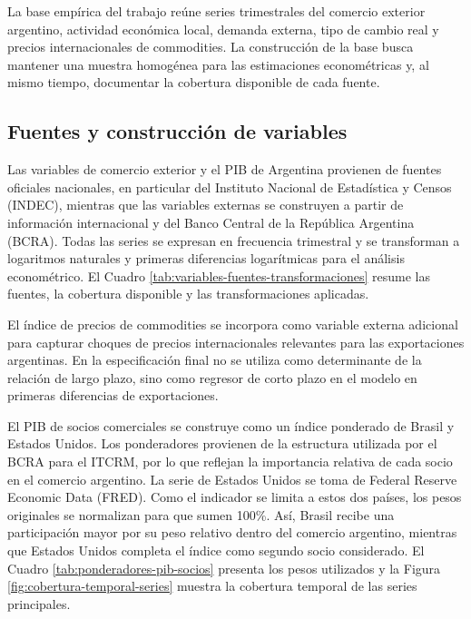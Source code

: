 \documentclass[11pt]{article}
\begin{document}
La base empírica del trabajo reúne series trimestrales del comercio exterior
argentino, actividad económica local, demanda externa, tipo de cambio real y
precios internacionales de commodities. La construcción de la base busca
mantener una muestra homogénea para las estimaciones econométricas y, al mismo
tiempo, documentar la cobertura disponible de cada fuente.

\subsection{Fuentes y construcción de variables}
\label{subsec:fuentes-construccion-variables}

Las variables de comercio exterior y el PIB de Argentina provienen de fuentes
oficiales nacionales, en particular del Instituto Nacional de Estadística y
Censos (INDEC), mientras que las variables externas se construyen a partir de
información internacional y del Banco Central de la República Argentina (BCRA).
Todas las series se expresan en frecuencia trimestral y se transforman a
logaritmos naturales y primeras diferencias logarítmicas para el análisis
econométrico. El Cuadro \ref{tab:variables-fuentes-transformaciones} resume las
fuentes, la cobertura disponible y las transformaciones aplicadas.

El índice de precios de commodities se incorpora como variable externa adicional
para capturar choques de precios internacionales relevantes para las exportaciones
argentinas. En la especificación final no se utiliza como determinante de la
relación de largo plazo, sino como regresor de corto plazo en el modelo en
primeras diferencias de exportaciones.

El PIB de socios comerciales se construye como un índice ponderado de Brasil y
Estados Unidos. Los ponderadores provienen de la estructura utilizada por el
BCRA para el ITCRM, por lo que reflejan la importancia relativa de cada socio en
el comercio argentino. La serie de Estados Unidos se toma de Federal Reserve
Economic Data (FRED). Como el indicador se limita a estos dos países, los pesos
originales se normalizan para que sumen 100\%. Así, Brasil recibe una
participación mayor por su peso relativo dentro del comercio argentino, mientras
que Estados Unidos completa el índice como segundo socio considerado. El Cuadro
\ref{tab:ponderadores-pib-socios} presenta los pesos utilizados y la Figura
\ref{fig:cobertura-temporal-series} muestra la cobertura temporal de las series
principales.
\end{document}
